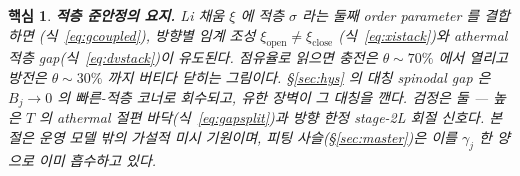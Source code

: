 \documentclass[11pt,a4paper]{article}
\newtheorem*{keybox}{핵심}
\begin{document}
\begin{keybox}
\textbf{적층 준안정의 요지.} Li 채움 $\xi$ 에 적층 $\sigma$ 라는 둘째 order parameter 를 결합하면
(식~\eqref{eq:gcoupled}), 방향별 임계 조성 $\xi_{\mathrm{open}}\ne\xi_{\mathrm{close}}$
(식~\eqref{eq:xistack})와 athermal 적층 gap(식~\eqref{eq:dvstack})이 \emph{유도}된다. 점유율로 읽으면
충전은 $\theta\!\sim\!70\%$ 에서 열리고 방전은 $\theta\!\sim\!30\%$ 까지 버티다 닫히는 그림이다.
\S\ref{sec:hys} 의 대칭 spinodal gap 은 $B_j\to0$ 의 빠른-적층 코너로 회수되고, 유한 장벽이 그 대칭을
깬다. 검정은 둘 — 높은 $T$ 의 athermal 절편 바닥(식~\eqref{eq:gapsplit})과 방향 한정 stage-2L 회절
신호다. 본 절은 운영 모델 밖의 \emph{가설적 미시 기원}이며, 피팅 사슬(\S\ref{sec:master})은 이를
$\gamma_j$ 한 양으로 이미 흡수하고 있다.
\end{keybox}
\end{document}
